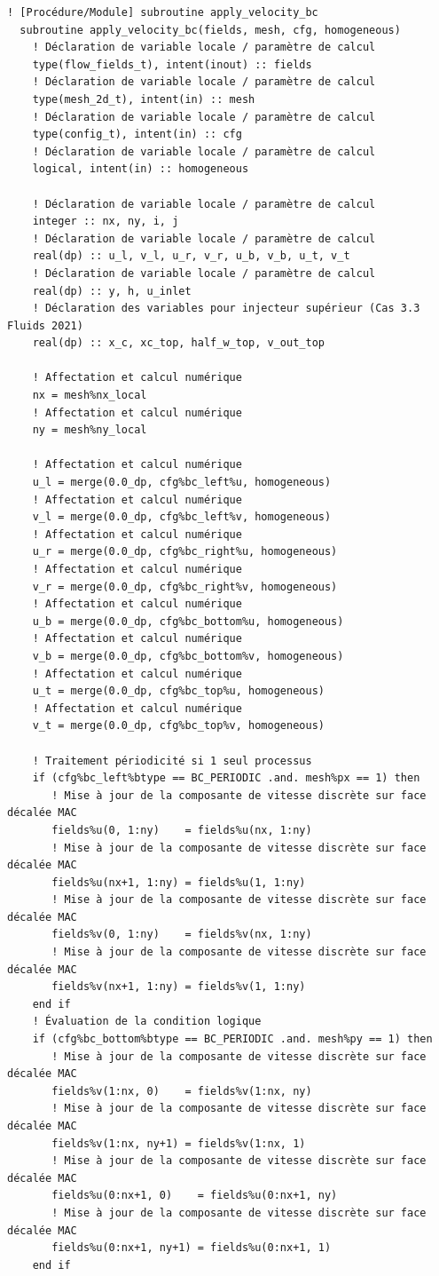\documentclass[10pt,a4paper,oneside]{book}
\begin{document}
\begin{lstlisting}[language={[95]Fortran}]
  ! [Procédure/Module] subroutine apply_velocity_bc
  subroutine apply_velocity_bc(fields, mesh, cfg, homogeneous)
    ! Déclaration de variable locale / paramètre de calcul
    type(flow_fields_t), intent(inout) :: fields
    ! Déclaration de variable locale / paramètre de calcul
    type(mesh_2d_t), intent(in) :: mesh
    ! Déclaration de variable locale / paramètre de calcul
    type(config_t), intent(in) :: cfg
    ! Déclaration de variable locale / paramètre de calcul
    logical, intent(in) :: homogeneous

    ! Déclaration de variable locale / paramètre de calcul
    integer :: nx, ny, i, j
    ! Déclaration de variable locale / paramètre de calcul
    real(dp) :: u_l, v_l, u_r, v_r, u_b, v_b, u_t, v_t
    ! Déclaration de variable locale / paramètre de calcul
    real(dp) :: y, h, u_inlet
    ! Déclaration des variables pour injecteur supérieur (Cas 3.3 Fluids 2021)
    real(dp) :: x_c, xc_top, half_w_top, v_out_top

    ! Affectation et calcul numérique
    nx = mesh%nx_local
    ! Affectation et calcul numérique
    ny = mesh%ny_local

    ! Affectation et calcul numérique
    u_l = merge(0.0_dp, cfg%bc_left%u, homogeneous)
    ! Affectation et calcul numérique
    v_l = merge(0.0_dp, cfg%bc_left%v, homogeneous)
    ! Affectation et calcul numérique
    u_r = merge(0.0_dp, cfg%bc_right%u, homogeneous)
    ! Affectation et calcul numérique
    v_r = merge(0.0_dp, cfg%bc_right%v, homogeneous)
    ! Affectation et calcul numérique
    u_b = merge(0.0_dp, cfg%bc_bottom%u, homogeneous)
    ! Affectation et calcul numérique
    v_b = merge(0.0_dp, cfg%bc_bottom%v, homogeneous)
    ! Affectation et calcul numérique
    u_t = merge(0.0_dp, cfg%bc_top%u, homogeneous)
    ! Affectation et calcul numérique
    v_t = merge(0.0_dp, cfg%bc_top%v, homogeneous)

    ! Traitement périodicité si 1 seul processus
    if (cfg%bc_left%btype == BC_PERIODIC .and. mesh%px == 1) then
       ! Mise à jour de la composante de vitesse discrète sur face décalée MAC
       fields%u(0, 1:ny)    = fields%u(nx, 1:ny)
       ! Mise à jour de la composante de vitesse discrète sur face décalée MAC
       fields%u(nx+1, 1:ny) = fields%u(1, 1:ny)
       ! Mise à jour de la composante de vitesse discrète sur face décalée MAC
       fields%v(0, 1:ny)    = fields%v(nx, 1:ny)
       ! Mise à jour de la composante de vitesse discrète sur face décalée MAC
       fields%v(nx+1, 1:ny) = fields%v(1, 1:ny)
    end if
    ! Évaluation de la condition logique
    if (cfg%bc_bottom%btype == BC_PERIODIC .and. mesh%py == 1) then
       ! Mise à jour de la composante de vitesse discrète sur face décalée MAC
       fields%v(1:nx, 0)    = fields%v(1:nx, ny)
       ! Mise à jour de la composante de vitesse discrète sur face décalée MAC
       fields%v(1:nx, ny+1) = fields%v(1:nx, 1)
       ! Mise à jour de la composante de vitesse discrète sur face décalée MAC
       fields%u(0:nx+1, 0)    = fields%u(0:nx+1, ny)
       ! Mise à jour de la composante de vitesse discrète sur face décalée MAC
       fields%u(0:nx+1, ny+1) = fields%u(0:nx+1, 1)
    end if


\end{lstlisting}
\end{document}
